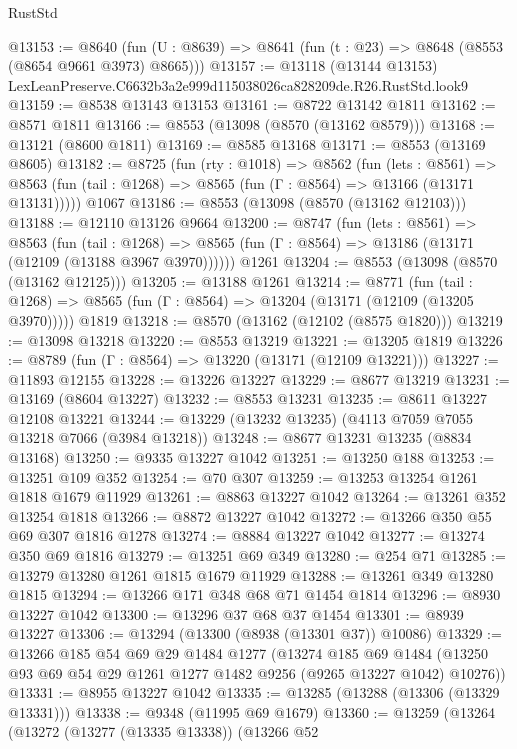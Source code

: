 \begin{lexlean}{RustStd}
\begin{coremodule}
@13153 := @8640
    (fun (U : @8639) => @8641 (fun (t : @23) => @8648 (@8553 (@8654 @9661 @3973) @8665)))
@13157 := @13118 (@13144 @13153) LexLeanPreserve.C6632b3a2e999d115038026ca828209de.R26.RustStd.look9
@13159 := @8538 @13143 @13153
@13161 := @8722 @13142 @1811
@13162 := @8571 @1811
@13166 := @8553 (@13098 (@8570 (@13162 @8579)))
@13168 := @13121 (@8600 @1811)
@13169 := @8585 @13168
@13171 := @8553 (@13169 @8605)
@13182 := @8725
    (fun (rty : @1018) =>
    @8562
      (fun (lets : @8561) =>
      @8563 (fun (tail : @1268) => @8565 (fun (Γ : @8564) => @13166 (@13171 @13131)))))
    @1067
@13186 := @8553 (@13098 (@8570 (@13162 @12103)))
@13188 := @12110 @13126 @9664
@13200 := @8747
    (fun (lets : @8561) =>
    @8563
      (fun (tail : @1268) =>
      @8565 (fun (Γ : @8564) => @13186 (@13171 (@12109 (@13188 @3967 @3970))))))
    @1261
@13204 := @8553 (@13098 (@8570 (@13162 @12125)))
@13205 := @13188 @1261
@13214 := @8771
    (fun (tail : @1268) => @8565 (fun (Γ : @8564) => @13204 (@13171 (@12109 (@13205 @3970)))))
    @1819
@13218 := @8570 (@13162 (@12102 (@8575 @1820)))
@13219 := @13098 @13218
@13220 := @8553 @13219
@13221 := @13205 @1819
@13226 := @8789 (fun (Γ : @8564) => @13220 (@13171 (@12109 @13221)))
@13227 := @11893 @12155
@13228 := @13226 @13227
@13229 := @8677 @13219
@13231 := @13169 (@8604 @13227)
@13232 := @8553 @13231
@13235 := @8611 @13227 @12108 @13221
@13244 := @13229 (@13232 @13235) (@4113 @7059 @7055 @13218 @7066 (@3984 @13218))
@13248 := @8677 @13231 @13235 (@8834 @13168)
@13250 := @9335 @13227 @1042
@13251 := @13250 @188
@13253 := @13251 @109 @352
@13254 := @70 @307
@13259 := @13253 @13254 @1261 @1818 @1679 @11929
@13261 := @8863 @13227 @1042
@13264 := @13261 @352 @13254 @1818
@13266 := @8872 @13227 @1042
@13272 := @13266 @350 @55 @69 @307 @1816 @1278
@13274 := @8884 @13227 @1042
@13277 := @13274 @350 @69 @1816
@13279 := @13251 @69 @349
@13280 := @254 @71
@13285 := @13279 @13280 @1261 @1815 @1679 @11929
@13288 := @13261 @349 @13280 @1815
@13294 := @13266 @171 @348 @68 @71 @1454 @1814
@13296 := @8930 @13227 @1042
@13300 := @13296 @37 @68 @37 @1454
@13301 := @8939 @13227
@13306 := @13294 (@13300 (@8938 (@13301 @37)) @10086)
@13329 := @13266
    @185
    @54
    @69
    @29
    @1484
    @1277
    (@13274
      @185
      @69
      @1484
      (@13250 @93 @69 @54 @29 @1261 @1277 @1482 @9256 (@9265 @13227 @1042) @10276))
@13331 := @8955 @13227 @1042
@13335 := @13285 (@13288 (@13306 (@13329 @13331)))
@13338 := @9348 (@11995 @69 @1679)
@13360 := @13259
    (@13264
      (@13272
        (@13277 (@13335 @13338))
        (@13266
          @52

\end{coremodule}
\end{lexlean}

